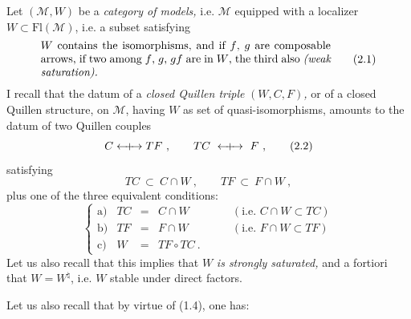 \documentclass[11pt]{article}
\newcommand{\Qcouple}{\mathrel{\leftarrow\mkern-9mu{+}\mkern-9mu\rightarrow}}
\begin{document}
Let $(\mathcal{M}, W)$ be a \textit{category of models,} i.e. $\mathcal{M}$ equipped with a localizer $W \subset \mathrm{Fl}(\mathcal{M})$, i.e. a subset satisfying
\[
\parbox{0.75\textwidth}{$W$ contains the isomorphisms, and if $f$, $g$ are composable arrows, if two among $f$, $g$, $gf$ are in $W$, the third also \textit{(weak saturation).}}
\tag*{(2.1)}
\]
I recall that the datum of a \textit{closed Quillen triple} $(W, C, F)$\textit{,} or of a closed Quillen structure, on $\mathcal{M}$, having $W$ as set of quasi-isomorphisms, amounts to the datum of two Quillen couples
\[
C \Qcouple TF\ , \qquad TC \ \Qcouple\ F\ , \tag*{(2.2)}
\]
satisfying
\[
TC \ \subset\ C \cap W\ , \qquad TF \ \subset\ F \cap W\ , \tag*{(2.3)}
\]
plus one of the three equivalent conditions:
\[
\left\{
\begin{array}{lrcll}
\text{a)} & TC & = & C \cap W & \qquad (\text{i.e. } C \cap W \subset TC) \\[1ex]
\text{b)} & TF & = & F \cap W & \qquad (\text{i.e. } F \cap W \subset TF) \\[1ex]
\text{c)} & W & = & TF \circ TC\ . &
\end{array}
\right.
\tag*{(2.4)}
\]
Let us also recall that this implies that $W$ \textit{is strongly saturated,} and a fortiori that $W = W^{\natural}$, i.e. $W$ stable under direct factors.

Let us also recall that by virtue of (1.4), one has:
\end{document}
